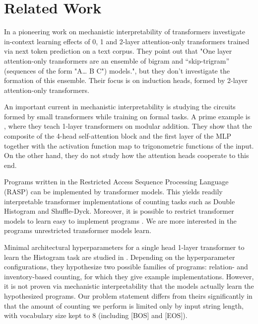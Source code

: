 \section{Related Work}
\label{sec:related}

In a pioneering work on mechanistic interpretability of transformers 
\cite{elhage2021mathematical} investigate in-context
learning effects of 0, 1 and 2-layer attention-only transformers trained via
next token prediction on a text corpus. They point out that "One layer
attention-only transformers are an ensemble of bigram and “skip-trigram”
(sequences of the form "A… B C") models.", but they don't investigate the
formation of this ensemble. Their focus is on induction heads, formed by
2-layer attention-only transformers.

An important current in mechanistic interpretability is studying the circuits formed by small transformers while training on formal tasks. A prime example is \cite{Nanda:2023}, where they teach 1-layer transformers on modular addition. They show that the composite of the 4-head self-attention block and the first layer of the MLP together with the activation function map to trigonometric functions of the input. On the other hand, they do not study how the attention heads cooperate to this end.

Programs written in the Restricted Access Sequence Processing Language (RASP)
\cite{weiss2021thinking} can be implemented by transformer models. This yields
readily interpretable transformer implementations of counting tasks such as
Double Histogram and Shuffle-Dyck. Moreover, it is possible to restrict
transformer models to learn easy to implement programs
\cite{friedman2023learning}. We are more interested in the programs
unrestricted transformer models learn.

Minimal architectural hyperparameters for a single head 1-layer transformer to
learn the Histogram task are studied in \cite{behrens2024counting}. Depending
on the hyperparameter configurations, they hypothesize two possible families
of programs: relation- and inventory-based counting, for which they give
example implementations. However, it is not proven via mechanistic
interpretability that the models actually learn the hypothesized programs. Our
problem statement differs from theirs significantly in that the amount of
counting we perform is limited only by input string length, with vocabulary
size kept to 8 (including [BOS] and [EOS]).

